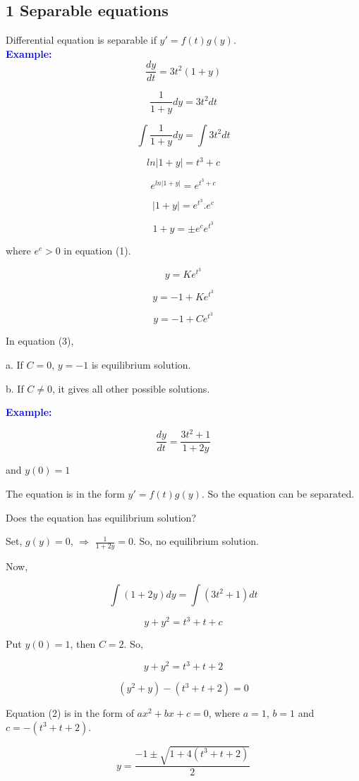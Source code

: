 \documentclass[
  11pt,
]{article}
\begin{document}
\subsection{1 Separable equations}\label{separable-equations}

Differential equation is separable if \(y'=f(t)g(y)\).\\

\textbf{\textcolor{blue}{Example:}} \[\frac{dy}{dt} = 3t^2(1+y)\]

\[
\frac{1}{1+y}dy = 3t^2dt \tag{1}
\]

\[
\int\frac{1}{1+y}dy = \int3t^2dt
\]

\[
ln|{1+y}|=t^3 + c
\]

\[
e^{ln|1+y|}=e^{t^3+c}
\]

\[
|1+y|=e^{t^3}.e^c 
\]

\[
1+y = \pm e^ce^{t^3} \tag{2}
\]

where \(e^c>0\) in equation (1).

\[
y = Ke^{t^3}
\]

\[
y = -1 + Ke^{t^3}
\]

\[
y = -1 + Ce^{t^3} \tag{3}
\]

In equation (3),

a. If \(C = 0\), \(y=-1\) is equilibrium solution.

b. If \(C \neq 0\), it gives all other possible solutions.

\textbf{\textcolor{blue}{Example:}}

\[
\frac{dy}{dt}=\frac{3t^2+1}{1+2y}
\]

and \(y(0) = 1\)

The equation is in the form \(y'=f(t)g(y)\). So the equation can be
separated.

Does the equation has equilibrium solution?

Set, \(g(y) = 0\), \(\Longrightarrow\) \(\frac{1}{1+2y} = 0\). So, no
equilibrium solution.

Now,

\[
\int(1+2y)dy=\int(3t^2+1)dt
\]

\[
y+y^2=t^3+t+c \tag{1}
\]

Put \(y(0) = 1\), then \(C = 2\). So,

\[
y+y^2=t^3+t+2
\]

\[
(y^2+y)-(t^3+t+2)=0 \tag{2}
\]

Equation (2) is in the form of \(ax^2+bx+c = 0\), where \(a = 1\),
\(b = 1\) and \(c = -(t^3+t+2)\).

\[
y = \frac{-1\pm\sqrt{1+4(t^3+t+2)}}{2}
\]
\end{document}
